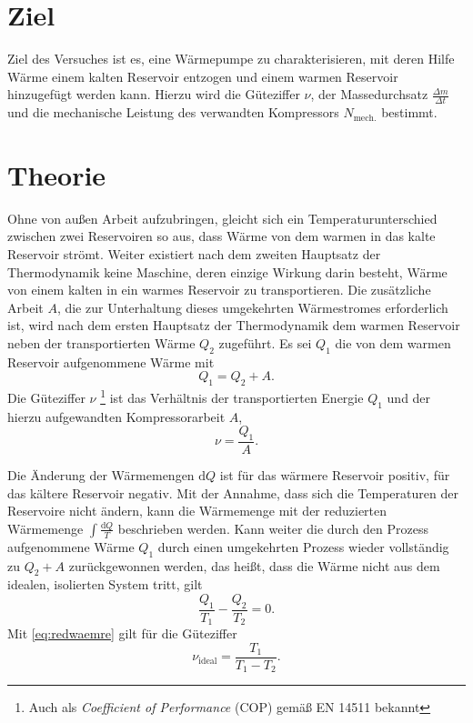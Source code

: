 \section{Ziel}
\label{sec:Ziel}
Ziel des Versuches ist es, eine Wärmepumpe zu charakterisieren, mit deren Hilfe Wärme einem kalten Reservoir entzogen und einem warmen Reservoir hinzugefügt werden kann.
Hierzu wird die Güteziffer $\nu$, der Massedurchsatz $\frac{\Delta{m}}{\Delta{t}}$ und die mechanische Leistung des verwandten Kompressors $N_\text{mech.}$ bestimmt.
\section{Theorie}
\label{sec:Theorie}
Ohne von außen Arbeit aufzubringen, gleicht sich ein Temperaturunterschied zwischen zwei Reservoiren so aus, 
dass Wärme von dem warmen in das kalte Reservoir strömt.
Weiter existiert nach dem zweiten Hauptsatz der Thermodynamik keine Maschine, deren einzige Wirkung darin besteht, Wärme von einem kalten in ein warmes Reservoir zu transportieren\cite{hauptsaetzederthermodynamik}.
Die zusätzliche Arbeit $A$, die zur Unterhaltung dieses umgekehrten Wärmestromes erforderlich ist, wird nach dem ersten Hauptsatz der Thermodynamik dem warmen Reservoir neben der transportierten Wärme $Q_2$ %
zugeführt.
Es sei $Q_1$ die von dem warmen Reservoir aufgenommene Wärme mit
\begin{equation}
	Q_1 = Q_2+A.
	\label{eq:waermetransport}
\end{equation}
Die Güteziffer $\nu$ \footnote{Auch als \textit{Coefficient of Performance} (COP) gemäß EN 14511 bekannt} ist das Verhältnis der transportierten Energie $Q_1$ und der hierzu aufgewandten Kompressorarbeit $A$,
\begin{equation}
	\nu = \frac{Q_1}{A}.
	\label{eq:gueteziffer}
\end{equation}

\noindent Die Änderung der Wärmemengen $\mathup{d}Q$ ist für das wärmere Reservoir positiv, für das kältere Reservoir negativ.
Mit der Annahme, dass sich die Temperaturen der Reservoire nicht ändern, kann die Wärmemenge mit der reduzierten Wärmemenge $\int \frac{\mathup{d}Q}{T}$ beschrieben werden. 
Kann weiter die durch den Prozess aufgenommene Wärme $Q_1$ durch einen umgekehrten Prozess wieder vollständig zu $Q_2 + A$ zurückgewonnen werden, das heißt, dass die Wärme nicht aus dem idealen, isolierten System tritt, gilt
\begin{equation}
	\frac{Q_1}{T_1}-\frac{Q_2}{T_2} = 0.
	\label{eq:redwaemre}
\end{equation}
Mit \eqref{eq:redwaemre} gilt für die Güteziffer
\begin{equation}
	\nu_{\text{ideal}} = \frac{T_1}{T_1-T_2}.
	\label{eq:gueteziffer_ideal}
\end{equation}

